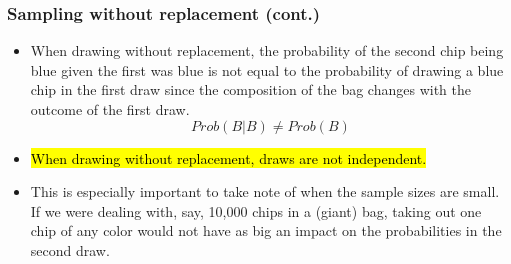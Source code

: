 \documentclass[slidestop,compress,mathserif]{beamer}
\newcommand{\soln}[1]{\textit{#1}}
\begin{document}
\begin{frame}
\frametitle{Sampling without replacement (cont.)}

\begin{itemize}

\item When drawing without replacement, the probability of the second chip being blue given the first was blue is not equal to the probability of drawing a blue chip in the first draw since the composition of the bag changes with the outcome of the first draw.
\[ Prob(B | B) \ne Prob(B) \]

\pause

\item \hl{When drawing without replacement, draws are not independent.}

\pause

\item This is especially important to take note of when the sample sizes are small. If we were dealing with, say, 10,000 chips in a (giant) bag, taking out one chip of any color would not have as big an impact on the probabilities in the second draw.

\end{itemize}

\end{frame}






\end{document}
